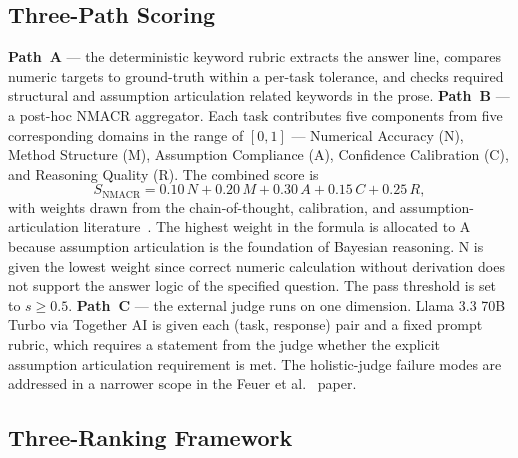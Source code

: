 \subsection{Three-Path Scoring}
\label{sec:scoring}

\textbf{Path~A} --- the deterministic keyword rubric extracts the
answer line, compares numeric targets to ground-truth within a
per-task tolerance, and checks required structural and assumption
articulation related keywords in the prose. \textbf{Path~B} --- a
post-hoc NMACR aggregator. Each task contributes five components
from five corresponding domains in the range of $[0,1]$ ---
Numerical Accuracy (N), Method Structure (M), Assumption Compliance
(A), Confidence Calibration (C), and Reasoning Quality (R). The
combined score is
\begin{equation}
  S_{\text{NMACR}} = 0.10\,N + 0.20\,M + 0.30\,A + 0.15\,C + 0.25\,R,
  \label{eq:nmacr}
\end{equation}
with weights drawn from the chain-of-thought, calibration, and
assumption-articulation
literature~\cite{wei2022cot,chen2022pot,guo2017calibration,du2025icecream,park2025judge,nagarkar2026canllm,fermieval2025,liu2025matheval}.
The highest weight in the formula is allocated to A because
assumption articulation is the foundation of Bayesian reasoning.
N is given the lowest weight since correct numeric calculation
without derivation does not support the answer logic of the
specified question. The pass threshold is set to $s \geq 0.5$.
\textbf{Path~C} --- the external judge runs on one dimension.
Llama 3.3 70B Turbo via Together AI is given each (task,
response) pair and a fixed prompt rubric, which requires a statement
from the judge whether the explicit assumption articulation
requirement is met. The holistic-judge failure modes are addressed
in a narrower scope in the Feuer et al.~\cite{judgment2025noise}
paper.

\subsection{Three-Ranking Framework}

